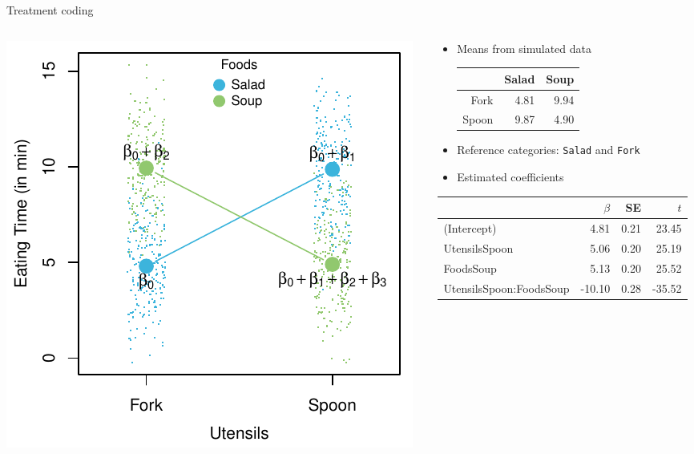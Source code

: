 \documentclass[aspectratio=169]{beamer}
\begin{document}
\begin{frame}{Treatment coding}
  \begin{columns}
    \begin{column}{.45\textwidth}
      \includegraphics[scale = .8]{../figures/contrasts_dummy}
    \end{column}
    \begin{column}{.5\textwidth}
      \small
      \begin{itemize}
        \item Means from simulated data\vspace{.2cm}
\begin{tabular}{rrr}
  \hline
 & Salad & Soup \\ 
  \hline
Fork & 4.81 & 9.94 \\ 
  Spoon & 9.87 & 4.90 \\ 
   \hline
\end{tabular}
        \item Reference categories: \texttt{Salad} and \texttt{Fork}
        \item Estimated coefficients
      \end{itemize}
      \begin{tabular}{@{}lrrr@{}}
  \hline
 & $\beta$ & SE & $t$ \\ 
  \hline
(Intercept) & 4.81 & 0.21 & 23.45 \\ 
  UtensilsSpoon & 5.06 & 0.20 & 25.19 \\ 
  FoodsSoup & 5.13 & 0.20 & 25.52 \\ 
  UtensilsSpoon:FoodsSoup & -10.10 & 0.28 & -35.52 \\ 
   \hline
\end{tabular}
    \end{column}
  \end{columns}
\end{frame}
\end{document}
